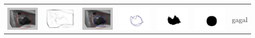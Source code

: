 \begin{table}[H]
\begin{tabular}{|m{0.7in}|m{0.7in}|m{0.7in}|m{0.7in}|m{0.7in}|m{0.7in}|m{0.7in}|}
		&  &  & & & &  \\
		\includegraphics[width=0.7in]{dataset/dataset_3/luka_hitam/ready/19_integer_init.jpg}&
		\includegraphics[width=0.7in]{dataset/dataset_3/luka_hitam/ready/19_integer_ext.jpg}&
		\includegraphics[width=0.7in]{dataset/dataset_3/luka_hitam/ready/19_integer_result.jpg}&
		\includegraphics[width=0.7in]{dataset/dataset_3/luka_hitam/ready/19_gt_r_integer.jpg}&
		\includegraphics[width=0.7in]{dataset/dataset_3/luka_hitam/ready/19_r.jpg}&
		\includegraphics[width=0.7in]{dataset/dataset_3/luka_hitam/ready/19_integer_r.jpg}&
		gagal\\
		\hline
		

\end{tabular}
\end{table}
